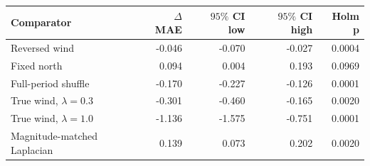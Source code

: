 \begin{tabular}{lrrrr}\hline
Comparator & $\Delta$MAE & $95\%$ CI low & $95\%$ CI high & Holm p \\
\hline
Reversed wind & -0.046 & -0.070 & -0.027 & 0.0004 \\
Fixed north & 0.094 & 0.004 & 0.193 & 0.0969 \\
Full-period shuffle & -0.170 & -0.227 & -0.126 & 0.0001 \\
True wind, $\lambda=0.3$ & -0.301 & -0.460 & -0.165 & 0.0020 \\
True wind, $\lambda=1.0$ & -1.136 & -1.575 & -0.751 & 0.0001 \\
Magnitude-matched Laplacian & 0.139 & 0.073 & 0.202 & 0.0020 \\
\hline
\end{tabular}
